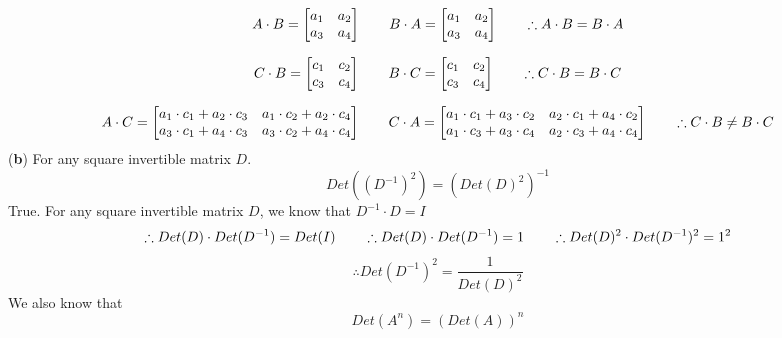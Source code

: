 \documentclass[12pt]{article}
\begin{document}
$$
A\cdot B = 
\begin{bmatrix}
   a_1 & a_2 \\
   a_3 & a_4 \\
\end{bmatrix}
\hspace*{20px}
B\cdot A = 
\begin{bmatrix}
   a_1 & a_2 \\
   a_3 & a_4 \\
\end{bmatrix}
\hspace*{20px}
\therefore
A\cdot B = B\cdot A
$$

$$
C\cdot B = 
\begin{bmatrix}
   c_1 & c_2 \\
   c_3 & c_4 \\
\end{bmatrix}
\hspace*{20px}
B\cdot C = 
\begin{bmatrix}
   c_1 & c_2 \\
   c_3 & c_4 \\
\end{bmatrix}
\hspace*{20px}
\therefore
C\cdot B = B\cdot C
$$

$$
A\cdot C = 
\begin{bmatrix}
   a_1\cdot c_1 + a_2\cdot c_3 & a_1\cdot c_2 + a_2\cdot c_4 \\
   a_3\cdot c_1 + a_4\cdot c_3 & a_3\cdot c_2 + a_4\cdot c_4 \\
\end{bmatrix}
\hspace*{20px}
C\cdot A = 
\begin{bmatrix}
   a_1\cdot c_1 + a_3\cdot c_2 & a_2\cdot c_1 + a_4\cdot c_2 \\
   a_1\cdot c_3 + a_3\cdot c_4 & a_2\cdot c_3 + a_4\cdot c_4 \\
\end{bmatrix}
\hspace*{20px}
\therefore
C\cdot B \neq B\cdot C
$$
\medskip
(\textbf{b}) For any square invertible matrix $D$. \\
$$Det((D^{-1})^2)=(Det(D)^2)^{-1}$$
True. For any square invertible matrix $D$, we know that $D^{-1} \cdot D=I$\\
$$
\therefore Det(D)\cdot Det(D^{-1})=Det(I)
\hspace*{20px}
\therefore Det(D)\cdot Det(D^{-1})=1
\hspace*{20px}
\therefore Det(D)^2\cdot Det(D^{-1})^2=1^2
$$
$$
\therefore
Det(D^{-1})^2=\frac{1}{Det(D)^2}
$$
We also know that
$$
Det(A^n)=(Det(A))^n
$$
\end{document}
